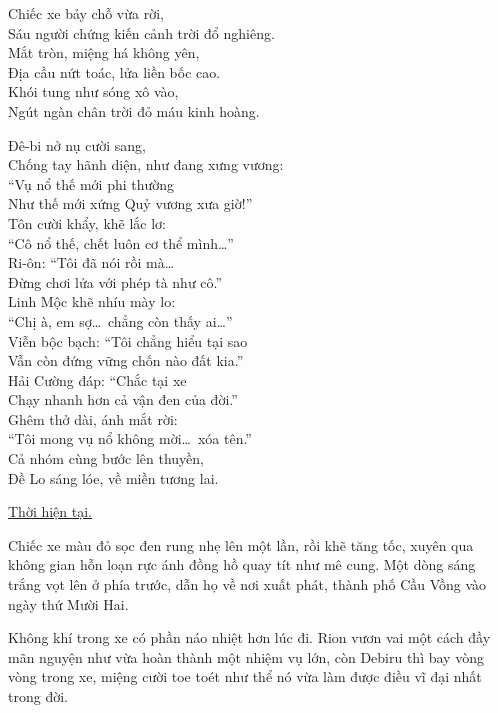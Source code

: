 \documentclass[../main.tex]{subfiles}
\begin{document}
\begin{center}

  \pov{-}

  Chiếc xe bảy chỗ vừa rời,\\
  Sáu người chứng kiến cảnh trời đổ nghiêng.\\
  Mắt tròn, miệng há không yên,\\
  Địa cầu nứt toác, lửa liền bốc cao.\\
  Khói tung như sóng xô vào,\\
  Ngút ngàn chân trời đỏ máu kinh hoàng.\\


  Đê-bi nở nụ cười sang,\\
  Chống tay hãnh diện, như đang xưng vương:\\
  ``Vụ nổ thế mới phi thường\\
  Như thế mới xứng Quỷ vương xưa giờ!''\\
  Tôn cười khẩy, khẽ lắc lơ:\\
  ``Cô nổ thế, chết luôn cơ thể mình\dots''\\
  Ri-ôn: ``Tôi đã nói rồi mà\dots\\
  Đừng chơi lửa với phép tà như cô.''\\
  Linh Mộc khẽ nhíu mày lo:\\
  ``Chị à, em sợ\dots\ chẳng còn thấy ai\dots''\\
  Viễn bộc bạch: ``Tôi chẳng hiểu tại sao\\
  Vẫn còn đứng vững chốn nào đất kia.''\\
  Hải Cường đáp: ``Chắc tại xe\\
  Chạy nhanh hơn cả vận đen của đời.''\\
  Ghêm thở dài, ánh mắt rời:\\
  ``Tôi mong vụ nổ không mời\dots\ xóa tên.''\\
  Cả nhóm cùng bước lên thuyền,\\
  Đề Lo sáng lóe, về miền tương lai.
\end{center}

\begin{center}
  \uline{Thời hiện tại.}
\end{center}

Chiếc xe màu đỏ sọc đen rung nhẹ lên một lần, rồi khẽ tăng tốc, xuyên qua không gian hỗn loạn rực ánh đồng hồ quay tít như mê cung. Một dòng sáng trắng vọt lên ở phía trước, dẫn họ về nơi xuất phát, thành phố Cầu Vồng vào ngày thứ Mười Hai.

Không khí trong xe có phần náo nhiệt hơn lúc đi. Rion vươn vai một cách đầy mãn nguyện như vừa hoàn thành một nhiệm vụ lớn, còn Debiru thì bay vòng vòng trong xe, miệng cười toe toét như thể nó vừa làm được điều vĩ đại nhất trong đời.
\end{document}
